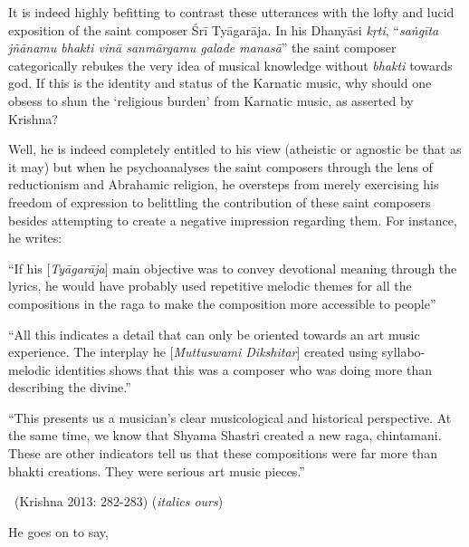 It is indeed highly befitting to contrast these utterances with the lofty and lucid exposition of the saint composer Śrī Tyāgarāja. In his Dhanyāsi \textit{kṛti}, “\textit{saṅgīta jñānamu bhakti vinā sanmārgamu galade manasā}” the saint composer categorically rebukes the very idea of musical knowledge without \textit{bhakti} towards god. If this is the identity and status of the Karnatic music, why should one obsess to shun the ‘religious burden’ from Karnatic music, as asserted by Krishna?

Well, he is indeed completely entitled to his view (atheistic or agnostic be that as it may) but when he psychoanalyses the saint composers through the lens of reductionism and Abrahamic religion, he oversteps from merely exercising his freedom of expression to belittling the contribution of these saint composers besides attempting to create a negative impression regarding them. For instance, he writes:

\begin{myquote}
“If his [\textit{Tyāgarāja}] main objective was to convey devotional meaning through the lyrics, he would have probably used repetitive melodic themes for all the compositions in the raga to make the composition more accessible to people”
\end{myquote}

\begin{myquote}
“All this indicates a detail that can only be oriented towards an art music experience. The interplay he [\textit{Muttuswami Dikshitar}] created using syllabo-melodic identities shows that this was a composer who was doing more than describing the divine.”
\end{myquote}

\begin{myquote}
“This presents us a musician’s clear musicological and historical perspective. At the same time, we know that Shyama Shastri created a new raga, chintamani. These are other indicators tell us that these compositions were far more than bhakti creations. They were serious art music pieces.” 

~\hfill (Krishna 2013: 282-283) (\textit{italics ours})
\end{myquote}

He goes on to say,

